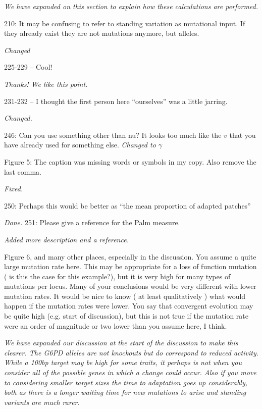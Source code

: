 \documentclass[12pt,letterpaper]{article}
\newcommand{\response}[1]{\emph{ \color{blue} #1}}
\begin{document}
\response{We have expanded on this section to explain how these calculations are performed.}

210: It may be confusing to refer to standing variation as mutational input. If they already exist they are not mutations anymore, but alleles.

\response{Changed}

225-229 -- Cool!

\response{Thanks! We like this point.}

231-232 -- I thought the first person here ``ourselves'' was a little jarring.

\response{Changed.}

246: Can you use something other than nu? It looks too much like the $v$ that you have already used for something else.
\response{Changed to $\gamma$}

Figure 5: The caption was missing words or symbols in my copy. Also remove the last comma.

\response{Fixed.}

250: Perhaps this would be better as ``the mean proportion of adapted patches''

\response{Done.}
251: Please give a reference for the Palm measure.

\response{Added more description and a reference.}

Figure 6, and many other places, especially in the discussion. You assume a quite large mutation rate here. This may be appropriate for a loss of function mutation ( is this the case for this example?), but it is very high for many types of mutations per locus. Many of your conclusions would be very different with lower mutation rates. It would be nice to know ( at least qualitatively ) what would happen if the mutation rates were lower. You say that convergent evolution may be quite high (e.g. start of discussion), but this is not true if the mutation rate were an order of magnitude or two lower than you assume here, I think. 

\response{We have expanded our discussion at the start of the discussion to make this clearer. The G6PD alleles are not knockouts but do correspond to reduced activity. While a 100bp target may be high for some traits, it perhaps is not when you consider all of the possible genes in which a change could occur. Also if you move to considering smaller target sizes the time to adaptation goes up considerably, both as there is a longer waiting time for new mutations to arise and standing variants are much rarer. }
\end{document}
